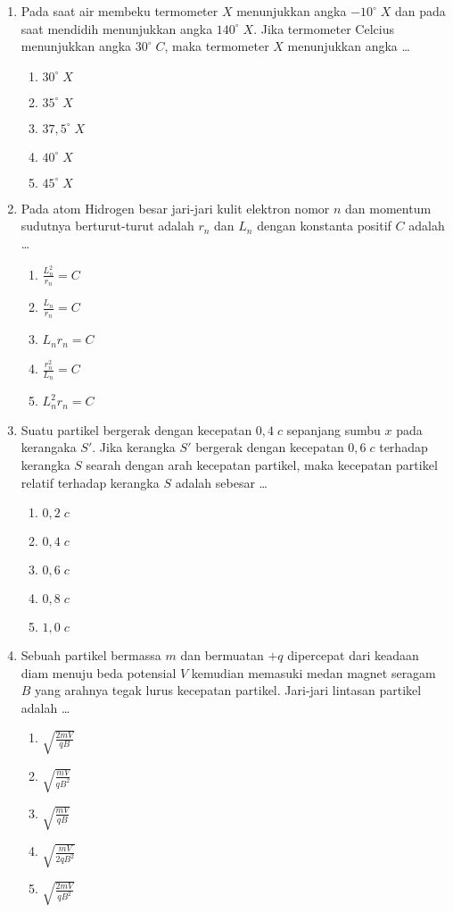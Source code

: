 \documentclass[A4,12PT, english, twocolumn]{journal}
\begin{document}
\begin{enumerate}
\item Pada saat air membeku termometer $X$ menunjukkan angka $-10^\circ \; X$ dan pada saat mendidih menunjukkan angka $140^\circ \; X$. Jika termometer Celcius menunjukkan angka $30^\circ \; C$, maka termometer $X$ menunjukkan angka \dots
    \begin{enumerate}
        \item $30^\circ \; X$
        \item $35^\circ \; X$
        \item $37,5^\circ \; X$
        \item $40^\circ \; X$
        \item $45^\circ \; X$
    \end{enumerate}

\item Pada atom Hidrogen besar jari-jari kulit elektron nomor $n$ dan momentum sudutnya berturut-turut adalah $r_n$ dan $L_n$ dengan konstanta positif $C$ adalah \dots
    \begin{enumerate}
        \item $\frac{L_n^2}{r_n}=C$
        \item $\frac{L_n}{r_n}=C$
        \item $L_n r_n=C$
        \item $\frac{r_n^2}{L_n}=C$
        \item $L_n^2 r_n=C$
    \end{enumerate}
 
\item Suatu partikel bergerak dengan kecepatan $0,4 \; c$ sepanjang sumbu $x$ pada kerangaka $S'$. Jika kerangka $S'$ bergerak dengan kecepatan $0,6 \; c$ terhadap kerangka $S$ searah dengan arah kecepatan partikel, maka kecepatan partikel relatif terhadap kerangka $S$ adalah sebesar \dots
    \begin{enumerate}
        \item $0,2 \; c$
        \item $0,4 \; c$
        \item $0,6 \; c$
        \item $0,8 \; c$
        \item $1,0 \; c$
    \end{enumerate}

\item Sebuah partikel bermassa $m$ dan bermuatan $+q$ dipercepat dari keadaan diam menuju beda potensial $V$ kemudian memasuki medan magnet seragam $B$ yang arahnya tegak lurus kecepatan partikel. Jari-jari lintasan partikel adalah \dots
    \begin{enumerate}
        \item $\sqrt{\frac{2mV}{qB}}$
        \item $\sqrt{\frac{mV}{qB^2}}$
        \item $\sqrt{\frac{mV}{qB}}$
        \item $\sqrt{\frac{mV}{2qB^2}}$
        \item $\sqrt{\frac{2mV}{qB^2}}$
    \end{enumerate}


\end{enumerate}
\end{document}
